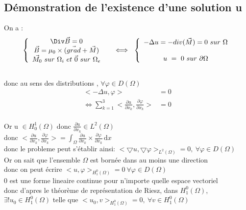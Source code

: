 \documentclass[a4paper,12pt,titlepage]{report}
\begin{document}
\begin{onehalfspace}
\begin{appendix}
\iffalse
\chapter{Démonstration de l'existence d'une solution u}
\label{Démonstration 1}
On a : 
\[
\left \{
\begin{array}{ccc}
  \Div\vec{B} = 0   &   \\
  \vec{B} = \mu_{0}\times(\vec{grad} +\vec{M}) \\
  \vec{M_{0} } \ sur \  \Omega_{i}  \ et \ \vec{0}  \ sur \  \Omega_{e}
\end{array}
\right .
 \iff \ \left\{\begin{array}{cc} -\Delta u= -div(\vec{M})=0 \ sur\ \Omega \\ \\u \ = \ 0 \ sur \ \partial \Omega \end{array}\right.
\]
\\
donc au sens des distributions , $\forall \varphi \in D(\Omega)$ 
\[
\begin{aligned}
<-\Delta u,\varphi> &=  0 \\
\iff \sum_{k=1}^{3} <  \frac{\partial u}{\partial x_{k}}, \frac{\partial \varphi}{\partial x_{k}}> &= 0
\end{aligned}
\]
\\
Or u $\in H^{1}_{0}(\Omega)$ donc $ \frac{\partial u}{\partial x_k} \in L^{2}(\Omega)$
\\
donc $<  \frac{\partial u}{\partial x_k}, \frac{\partial \varphi}{\partial x_k}>=\int_{\Omega} \frac{\partial u}{\partial x_k} \times \frac{\partial \varphi}{\partial x_k}\, \mathrm{d}x $
\\
donc le probleme peut s'établir ainsi: $<\bigtriangledown u ,\bigtriangledown \varphi>_{L^{2}(\Omega) }= 0 ,\ \forall \varphi \in D(\Omega) $
\\
Or on sait que l'ensemble $\Omega$ est bornée dans au moins une direction 
\\
donc on peut écrire $< u,\varphi>_{H^{0}_{1}(\Omega)}=0 \ \forall \varphi \in D(\Omega) $
\\
 0 est une forme lineaire continue pour n'importe quelle espace vectoriel 
 \\ donc d'apres le théorème de représentation de Riesz, dans $H^{0}_{1}(\Omega)$,
\\
$\exists ! u_{0} \in H^{0}_{1}(\Omega)$ telle que $<u_{0},v>_{H^{0}_{1}(\Omega)}=0,\ \forall v\in {H^{0}_{1}(\Omega)} $


\end{appendix}
\end{onehalfspace}
\end{document}
